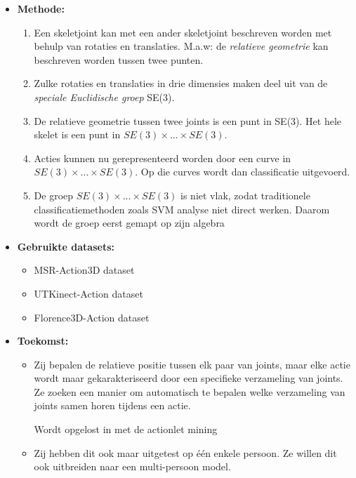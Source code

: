 \begin{itemize}
	\item \textbf{Methode:}
	\begin{enumerate}
		\item Een skeletjoint kan met een ander skeletjoint beschreven worden met behulp van rotaties en translaties. M.a.w: de \textit{relatieve geometrie} kan beschreven worden tussen twee punten.
		\item Zulke rotaties en translaties in drie dimensies maken deel uit van de \textit{speciale Euclidische groep} SE(3).
		\item De relatieve geometrie tussen twee joints is een punt in SE(3). Het hele skelet is een punt in $SE(3) \times ... \times SE(3)$.
		\item Acties kunnen nu gerepresenteerd worden door een curve in $SE(3) \times ... \times SE(3)$. Op die curves wordt dan classificatie uitgevoerd.
		\item De groep $SE(3) \times ... \times SE(3)$ is niet vlak, zodat traditionele classificatiemethoden zoals SVM analyse niet direct werken. Daarom wordt de groep eerst gemapt op zijn algebra 
	\end{enumerate}
	\item \textbf{Gebruikte datasets:}
	\begin{itemize}
		\item MSR-Action3D dataset
		\item UTKinect-Action dataset
		\item Florence3D-Action dataset
	\end{itemize}
	\item \textbf{Toekomst:}
	\begin{itemize}
		\item Zij bepalen de relatieve positie tussen elk paar van joints, maar elke actie wordt maar gekarakteriseerd door een specifieke verzameling van joints. Ze zoeken een manier om automatisch te bepalen welke verzameling van joints samen horen tijdens een actie. 
		
		{\color{green}Wordt opgelost in \cite{Wang2012b} met de actionlet mining}
		\item Zij hebben dit ook maar uitgetest op één enkele persoon. Ze willen dit ook uitbreiden naar een multi-persoon model.
	\end{itemize}
\end{itemize}


